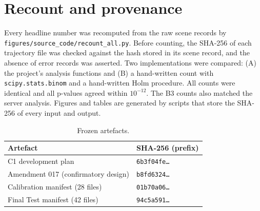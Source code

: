 \section{Recount and provenance}\label{sec:s-recount}

Every headline number was recomputed from the raw scene records by \texttt{figures/source\_code/recount\_all.py}. Before counting, the SHA-256 of each trajectory file was checked against the hash stored in its scene record, and the absence of error records was asserted. Two implementations were compared: (A) the project's analysis functions and (B) a hand-written count with \texttt{scipy.stats.binom} and a hand-written Holm procedure. All counts were identical and all p-values agreed within $10^{-12}$. The B3 counts also matched the server analysis. Figures and tables are generated by scripts that store the SHA-256 of every input and output.

\begin{table}[!htbp]
\centering\footnotesize
\caption{Frozen artefacts.}\label{tab:s-hash}
\begin{tabular}{ll}
\toprule
Artefact & SHA-256 (prefix)\\
\midrule
C1 development plan & \texttt{6b3f04fe\ldots}\\
Amendment 017 (confirmatory design) & \texttt{b8fd6324\ldots}\\
Calibration manifest (28 files) & \texttt{01b70a06\ldots}\\
Final Test manifest (42 files) & \texttt{94c5a591\ldots}\\
\bottomrule
\end{tabular}
\end{table}

